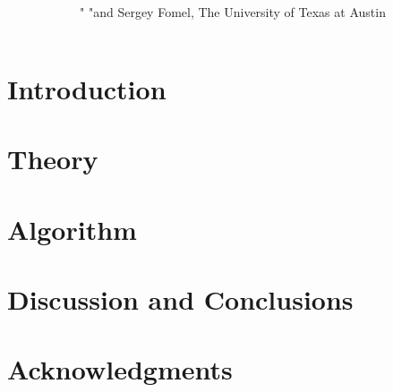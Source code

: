 

\title{ }

\lefthead{ \& }
\righthead{}

\renewcommand{\thefootnote}{\fnsymbol{footnote}} 

\author{"    "\footnotemark[1] and Sergey Fomel, The University of Texas at Austin}

\maketitle

\begin{abstract}

\end{abstract}

\section{Introduction}
 
\section{Theory}

\section{Algorithm}
 
\section{Discussion and Conclusions}

\section{Acknowledgments}




